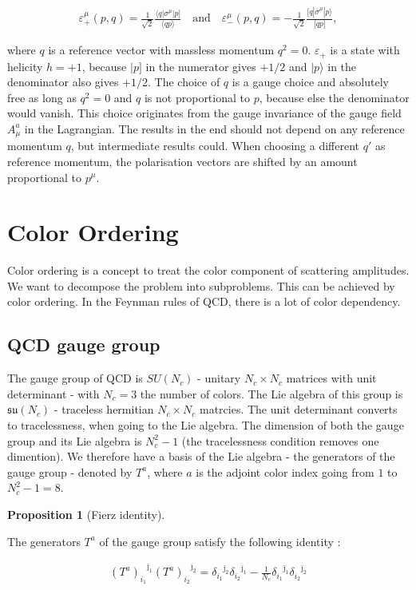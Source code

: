 \documentclass{article}
\theoremstyle{definition}
\newtheorem{prop}[theorem]{Proposition}
\numberwithin{equation}{section}
\begin{document}
\begin{align*}
    \varepsilon_{+}^{\mu}(p,q) = \frac{1}{\sqrt{2}} \frac{\langle q | \sigma^{\mu} | p \rbrack }{ \langle qp \rangle } \quad \text{and} \quad \varepsilon_{-}^{\mu}(p,q) = - \frac{1}{\sqrt{2}} \frac{\lbrack q | \overline{\sigma}^{\mu} | p \rangle }{ \lbrack qp \rbrack },
\end{align*}

where $q$ is a reference vector with massless momentum $q^2 = 0$. $\varepsilon_{+}$ is a state with helicity $h=+1$, because $| p \rbrack$ in the numerator gives $+1/2$ and $| p \rangle$ in the denominator also gives $+1/2$. The choice of $q$ is a gauge choice and absolutely free as long as $q^2=0$ and $q$ is not proportional to $p$, because else the denominator would vanish. This choice originates from the gauge invariance of the gauge field $A^a_{\mu}$ in the Lagrangian. The results in the end should not depend on any reference momentum $q$, but intermediate results could. When choosing a different $q'$ as reference momentum, the polarisation vectors are shifted by an amount proportional to $p^{\mu}$.

\section{Color Ordering}

Color ordering is a concept to treat the color component of scattering amplitudes. We want to decompose the problem into subproblems. This can be achieved by color ordering. In the Feynman rules of QCD, there is a lot of color dependency.

\subsection{QCD gauge group}

The gauge group of QCD is $SU(N_c)$ - unitary $N_c \times N_c$ matrices with unit determinant - with $N_c = 3$ the number of colors. The Lie algebra of this group is $\mathfrak{su}(N_c)$ - traceless hermitian $N_c \times N_c$ matrcies. The unit determinant converts to tracelessness, when going to the Lie algebra. The dimension of both the gauge group and its Lie algebra is $N_c^2 - 1$ (the tracelessness condition removes one dimention). We therefore have a basis of the Lie algebra - the generators of the gauge group - denoted by $T^a$, where $a$ is the adjoint color index going from $1$ to $N_c^2 - 1 = 8$.

\begin{prop}[Fierz identity]
\label{prop:fierz}

The generators $T^a$ of the gauge group satisfy the following identity \cite{bg87colorordering}:

\begin{align}
    {\left( T^a \right)_{i_1}}^{\bar{\jmath}_1} {\left( T^a \right)_{i_2}}^{\bar{\jmath}_2} = {\delta_{i_1}}^{\bar{\jmath}_2} {\delta_{i_2}}^{\bar{\jmath}_1} - \frac{1}{N_c} {\delta_{i_1}}^{\bar{\jmath}_1} {\delta_{i_2}}^{\bar{\jmath}_2} \label{eq:fierz2} 
\end{align}

\end{prop}
\end{document}
